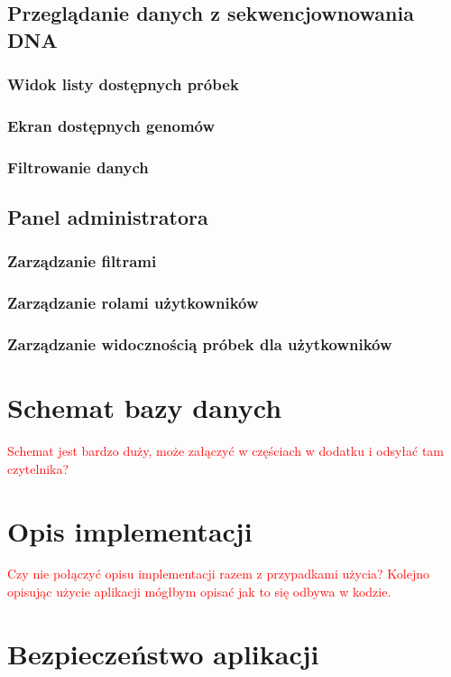 \documentclass[a4paper,12pt,twoside]{article}
\begin{document}
\subsection{Przeglądanie danych z sekwencjownowania DNA}
\subsubsection{Widok listy dostępnych próbek}
\subsubsection{Ekran dostępnych genomów}
\subsubsection{Filtrowanie danych}

\subsection{Panel administratora}
\subsubsection{Zarządzanie filtrami}
\subsubsection{Zarządzanie rolami użytkowników}
\subsubsection{Zarządzanie widocznością próbek dla użytkowników}

\newpage
\section{Schemat bazy danych}
\textcolor{red}{
Schemat jest bardzo duży, może załączyć w częściach w dodatku i odsyłać tam czytelnika?
}

\newpage
\section{Opis implementacji}  
\textcolor{red}{
Czy nie połączyć opisu implementacji razem z przypadkami użycia?
Kolejno opisując użycie aplikacji mógłbym opisać jak to się odbywa w kodzie.
}
\newpage
\section{Bezpieczeństwo aplikacji}  
\end{document}
